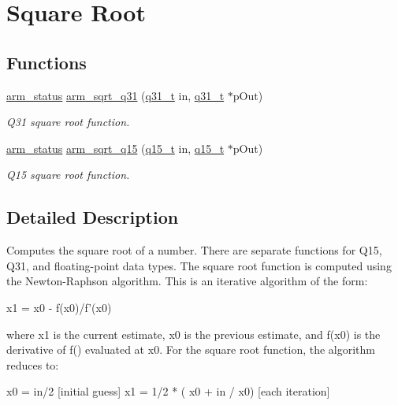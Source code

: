 \hypertarget{group___s_q_r_t}{}\section{Square Root}
\label{group___s_q_r_t}
\subsection*{Functions}
\begin{DoxyCompactItemize}
\item 
\mbox{\hyperlink{arm__math_8h_a5e459c6409dfcd2927bb8a57491d7cf6}{arm\+\_\+status}} \mbox{\hyperlink{group___s_q_r_t_ga119e25831e141d734d7ef10636670058}{arm\+\_\+sqrt\+\_\+q31}} (\mbox{\hyperlink{arm__math_8h_adc89a3547f5324b7b3b95adec3806bc0}{q31\+\_\+t}} in, \mbox{\hyperlink{arm__math_8h_adc89a3547f5324b7b3b95adec3806bc0}{q31\+\_\+t}} $\ast$p\+Out)
\begin{DoxyCompactList}\small\item\em Q31 square root function. \end{DoxyCompactList}\item 
\mbox{\hyperlink{arm__math_8h_a5e459c6409dfcd2927bb8a57491d7cf6}{arm\+\_\+status}} \mbox{\hyperlink{group___s_q_r_t_ga5abe5ca724f3e15849662b03752c1238}{arm\+\_\+sqrt\+\_\+q15}} (\mbox{\hyperlink{arm__math_8h_ab5a8fb21a5b3b983d5f54f31614052ea}{q15\+\_\+t}} in, \mbox{\hyperlink{arm__math_8h_ab5a8fb21a5b3b983d5f54f31614052ea}{q15\+\_\+t}} $\ast$p\+Out)
\begin{DoxyCompactList}\small\item\em Q15 square root function. \end{DoxyCompactList}\end{DoxyCompactItemize}


\subsection{Detailed Description}
Computes the square root of a number. There are separate functions for Q15, Q31, and floating-\/point data types. The square root function is computed using the Newton-\/\+Raphson algorithm. This is an iterative algorithm of the form\+: 
\begin{DoxyPre}
     x1 = x0 - f(x0)/f'(x0)
\end{DoxyPre}
 where {\ttfamily x1} is the current estimate, {\ttfamily x0} is the previous estimate, and {\ttfamily f\textquotesingle{}(x0)} is the derivative of {\ttfamily f()} evaluated at {\ttfamily x0}. For the square root function, the algorithm reduces to\+: 
\begin{DoxyPre}
    x0 = in/2                         [initial guess]
    x1 = 1/2 * ( x0 + in / x0)        [each iteration]
\end{DoxyPre}
 

